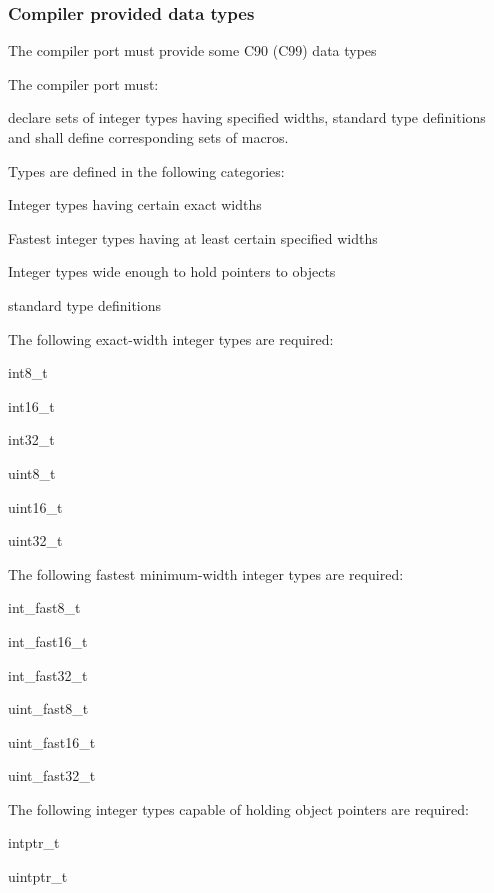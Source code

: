\subsubsection*{Compiler provided data types}
\label{_amgrp0fa76376c1171116a77221ec211612f0}%
The compiler port must provide some C90 (C99) data types

The compiler port must\-:
\begin{DoxyItemize}
\item declare sets of integer types having specified widths, standard type definitions and shall define corresponding sets of macros.
\end{DoxyItemize}

Types are defined in the following categories\-:
\begin{DoxyItemize}
\item Integer types having certain exact widths
\item Fastest integer types having at least certain specified widths
\item Integer types wide enough to hold pointers to objects
\item standard type definitions
\end{DoxyItemize}

The following exact-\/width integer types are required\-:
\begin{DoxyItemize}
\item int8\-\_\-t
\item int16\-\_\-t
\item int32\-\_\-t
\item uint8\-\_\-t
\item uint16\-\_\-t
\item uint32\-\_\-t
\end{DoxyItemize}

The following fastest minimum-\/width integer types are required\-:
\begin{DoxyItemize}
\item int\-\_\-fast8\-\_\-t
\item int\-\_\-fast16\-\_\-t
\item int\-\_\-fast32\-\_\-t
\item uint\-\_\-fast8\-\_\-t
\item uint\-\_\-fast16\-\_\-t
\item uint\-\_\-fast32\-\_\-t
\end{DoxyItemize}

The following integer types capable of holding object pointers are required\-:
\begin{DoxyItemize}
\item intptr\-\_\-t
\item uintptr\-\_\-t
\end{DoxyItemize}

